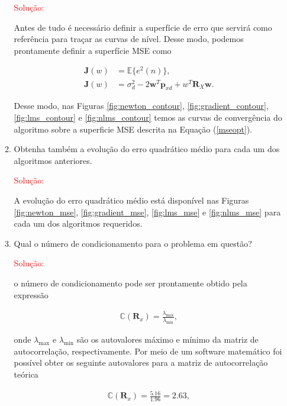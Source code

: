 \documentclass[a4paper,10pt]{article}
\begin{document}
\begin{enumerate}
\begin{enumerate}
						\textcolor{red}{Solução:}
						
						Antes de tudo é necessário definir a superfície de erro que servirá como referência para traçar as curvas de nível. Desse modo, podemos prontamente
						definir a superfície MSE como
						
						\begin{align}
							\mathbf{J}(w) &= \mathbb{E}\{e^{2}(n)\}, \\
							\mathbf{J}(w) &= \sigma^{2}_{d} - 2\mathbf{w}^{T}\mathbf{p}_{xd} + w^{T}\mathbf{R}_{X}\mathbf{w}. \label{mseopt}  
						\end{align}
						
						Desse modo, nas Figuras \ref{fig:newton_contour}, \ref{fig:gradient_contour}, \ref{fig:lms_contour} e \ref{fig:nlms_contour} temos as curvas de convergência do algoritmo sobre a superficie MSE descrita na Equação (\ref{mseopt}). 

					\item Obtenha também a evolução do erro quadrático médio para cada um dos algoritmos anteriores.
						
						\textcolor{red}{Solução:}

						A evolução do erro quadrático médio está disponível nas Figuras \ref{fig:newton_mse}, \ref{fig:gradient_mse}, \ref{fig:lms_mse} e \ref{fig:nlms_mse} para cada um dos algoritmos requeridos.
					
					\item Qual o número de condicionamento para o problema em questão?
					
						\textcolor{red}{Solução:}
						
						o número de condicionamento pode ser prontamente obtido pela expressão

						\begin{align}
							\mathbb{C} (\mathbf{R}_{x}) = \frac{\lambda_{\text{max}}}{\lambda_{\text{min}}},
						\end{align}
					
						onde $\lambda_{\text{max}}$ e $\lambda_{\text{min}}$ são os autovalores máximo e mínimo da matriz de autocorrelação, respectivamente. Por meio de um software
						matemático foi possível obter os seguinte autovalores para a matriz de autocorrelação teórica

						\begin{align}
							\mathbb{C} (\mathbf{R}_{x}) = \frac{5.16}{1.96} = 2.63,
						\end{align}


\end{enumerate}
\end{enumerate}
\end{document}

